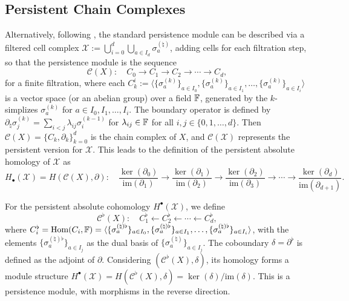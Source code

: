 \subsection{Persistent Chain Complexes}
Alternatively, following \cite[\S 2.6]{de2011dualities}, the standard persistence module
can be described via a filtered cell complex $\mathcal{X}:= \bigcup_{i=0}^{d}\bigcup_{a \in I_d} \sigma_a^{(\natural)}$, adding cells for each filtration step, so that the persistence module is the sequence
\[
	\mathcal{C}(X): \quad C_{0} \to C_{1} \to C_{2} \to \cdots \to C_{d},
\]
for a finite filtration, where each $C_{k}^{i} := \langle \{\sigma^{(k)}_a\}_{a \in I_0}, \{\sigma^{(k)}_a\}_{a \in I_1}, \ldots, \{\sigma^{(k)}_a\}_{a \in I_i}
\rangle$ is a vector space (or an abelian group) over a field ${\mathbb{F}}$, generated by the $k$-simplizes $\sigma^{(k)}_a$ for $a \in I_0, I_1, \ldots, I_i$. The boundary operator
is defined by $\partial_{\natural} \sigma^{(k)}_{j} = \sum_{i<j}\lambda_{ij}\sigma^{(k-1)}_{i}$ for $\lambda
_{ij}\in {\mathbb{F}}$ for all $i, j \in \{0, 1, \ldots, d\}$. Then $\mathcal{C}(X) = \{C_{k},\partial_{k}\}_{k=0}^{d}$ is the chain complex of $X$, and $\mathcal{C}(\mathcal{X})$ represents the persistent version for $\mathcal{X}$. This leads to the definition
of the persistent absolute homology of $\mathcal{X}$ as
\[
	H_{\bullet}(\mathcal{X}) = H(\mathcal{C}(X), \partial): \quad \frac{\ker(\partial_{0})}{\text{im}(\partial_{1})}
	\to \frac{\ker(\partial_{1})}{\text{im}(\partial_{2})} \to \frac{\ker(\partial_{2})}{\text{im}(\partial_{3})}\to \cdots \to \frac{\ker(\partial_{d})}{\text{im}(\partial_{d+1})}
	.
\]

For the persistent absolute cohomology $H^{\bullet}(\mathcal{X})$, we define
\[
	\label{cohomcomplex}
	\mathcal{C}^{\flat}(X): \quad C^{\flat}_{1} \leftarrow C^{\flat}_{2} \leftarrow \cdots
	\leftarrow C^{\flat}_{d},
\]
where $C_{i}^{\flat} = \text{Hom}(C_{i}, {\mathbb{F}}) = \langle \{\sigma^{(\natural)\flat}_a\}_{a \in I_0}, \{\sigma^{(\natural)\flat}_a\}_{a \in I_1}, \ldots, \{\sigma^{(\natural)\flat}_a\}_{a \in I_i} \rangle$, with the elements $\{\sigma^{(\natural)\flat}_a\}_{a\in I_j}$ as the dual basis of $\{\sigma^{(\natural)}_a\}_{a \in I_j}$. The coboundary $\delta
= \partial^{\flat}$ is defined as the adjoint of $\partial$. Considering $(\mathcal{C}^{\flat}(X), \delta)$, its homology forms a module structure $H^{\bullet}(\mathcal{X}) = H(\mathcal{C}^{\flat}(X), \delta) = \ker(\delta) / \text{im}(\delta)$. This is a persistence module, with morphisms in the reverse direction.

